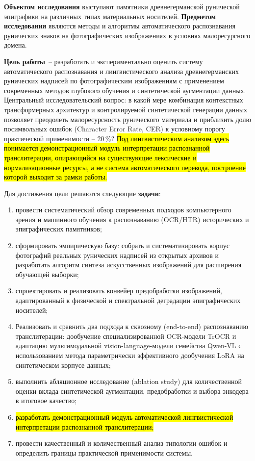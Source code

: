 \documentclass[a4paper,12pt]{extarticle}
\begin{document}
\textbf{Объектом исследования} выступают памятники древнегерманской рунической эпиграфики на различных типах материальных носителей. \textbf{Предметом исследования} являются методы и алгоритмы автоматического распознавания рунических знаков на фотографических изображениях в условиях малоресурсного домена.
 
\textbf{Цель работы}~-- разработать и экспериментально оценить систему
автоматического распознавания и лингвистического анализа древнегерманских
рунических надписей по фотографическим изображениям с применением современных
методов глубокого обучения и синтетической аугментации данных. Центральный исследовательский вопрос: в какой мере комбинация контекстных трансформерных архитектур и контролируемой синтетической генерации данных позволяет преодолеть малоресурсность рунического материала и приблизить долю посимвольных ошибок
(Character Error Rate, CER)  к условному порогу практической применимости -- 20\,\%? \hl{Под лингвистическим анализом здесь понимается
демонстрационный модуль интерпретации распознанной транслитерации, опирающийся
на существующие лексические и нормализационные ресурсы, а не система
автоматического перевода, построение которой выходит за рамки работы.}
 
Для достижения цели решаются следующие \textbf{задачи}:
\begin{enumerate}
    \item провести систематический обзор современных подходов компьютерного зрения и машинного обучения к распознаванию (OCR/HTR) исторических и эпиграфических памятников;
    \item сформировать эмпирическую базу: собрать и систематизировать корпус фотографий реальных рунических надписей из открытых архивов и разработать алгоритм синтеза искусственных изображений для расширения обучающей выборки;
    \item спроектировать и реализовать конвейер предобработки изображений, адаптированный к физической и спектральной деградации эпиграфических носителей;
        \item Реализовать и сравнить два подхода к сквозному (end-to-end) распознаванию транслитерации: дообучение специализированной OCR-модели TrOCR и адаптацию мультимодальной vision-language-модели семейства Qwen-VL с использованием метода параметрически эффективного дообучения LoRA на синтетическом корпусе данных;
    \item выполнить абляционное исследование (ablation study) для количественной оценки вклада синтетической аугментации, предобработки и выбора энкодера в итоговое качество;
    \item \hl{разработать демонстрационный модуль автоматической лингвистической интерпретации распознанной транслитерации;}
    \item провести качественный и количественный анализ типологии ошибок и определить границы практической применимости системы.
\end{enumerate}
 
\end{document}
